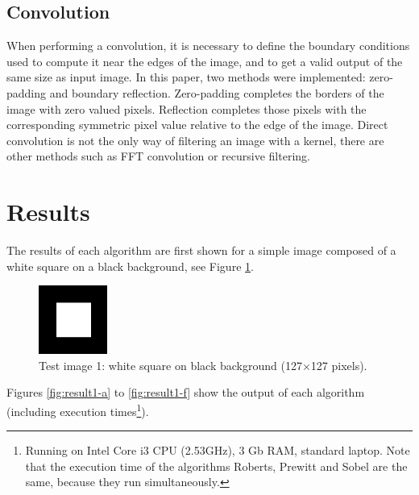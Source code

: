 \documentclass{ipol}
\numberwithin{equation}{section}
\numberwithin{table}{section}
\begin{document}

\subsection{Convolution}

When performing a convolution, it is necessary to define the boundary conditions used to compute it near the edges of the image, and to get a valid output of the same size as input image. In this paper, 
two methods were implemented: zero-padding and boundary reflection. Zero-padding completes the borders of the image with zero valued pixels. Reflection completes those pixels with the corresponding symmetric pixel value  relative to the edge of the image. Direct convolution is not the only way of filtering an image with a kernel, there are other methods such as FFT convolution or recursive filtering.%




\section{Results}
\label{sec:results}

The results of each algorithm are first shown for a simple image composed of a white square on a black background, see Figure \ref{fig:original1}. 

\begin{figure}[h!]
	\centering
	\includegraphics[width=0.2\textwidth]{results/square127.png}
	\caption{Test image 1: white square on black background (127$\times$127 pixels).}
	\label{fig:original1}
\end{figure}

Figures \ref{fig:result1-a} to \ref{fig:result1-f} show the output of each algorithm (including execution times\footnote{Running on Intel Core i3 CPU (2.53GHz), 3 Gb RAM, standard laptop. Note that the execution time of the algorithms Roberts, Prewitt and Sobel are the same, because they run simultaneously.}). 
\end{document}
